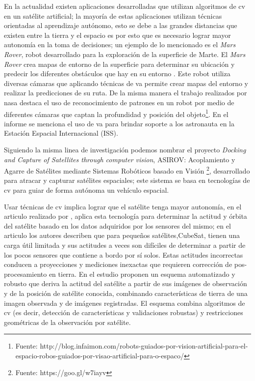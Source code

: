 En la actualidad existen aplicaciones desarrolladas que utilizan algoritmos de \ac{cv} en un satélite artificial; la mayoría de estas aplicaciones utilizan técnicas orientadas al aprendizaje autónomo, esto se debe a las grandes distancias que existen entre la tierra y el espacio es por esto que es necesario lograr mayor autonomía en la toma de decisiones; un ejemplo de lo mencionado es el \textit{Mars Rover}, robot desarrollado para la exploración de la superficie de Marte. El \textit{Mars Rover} crea mapas de entorno de la superficie para determinar su ubicación y predecir los diferentes obstáculos que hay en su entorno \citep{RoverMars}. Este robot utiliza  diversas cámaras que aplicando técnicas de \ac{va}  permite crear mapas del entorno y realizar la predicciones de su ruta. De la misma manera el trabajo realizados  por \ac{nasa}  destaca el uso de reconocimiento de patrones en un robot por medio de diferentes cámaras que captan la profundidad y posición del objeto\footnote{Fuente: 
http://blog.infaimon.com/robots-guiados-por-vision-artificial-para-el-espacio-robos-guiados-por-visao-artificial-para-o-espaco/}. En el informe se menciona el uso de \ac{va} para brindar soporte a los astronauta en la Estación Espacial Internacional (ISS). 

Siguiendo la misma linea de investigación podemos nombrar el proyecto \textit{Docking and Capture of Satellites through computer vision}, ASIROV: Acoplamiento y Agarre de Satélites mediante Sistemas Robóticos basado en Visión \footnote{Fuente: https://goo.gl/w7iayv}, desarrollado para atracar y capturar satélites espaciales; este sistema se basa  en tecnologías de \ac{cv} para guiar de forma autónoma un vehículo espacial.


Usar técnicas de \ac{cv} implica lograr que el satélite tenga mayor autonomía, en el articulo realizado por \cite{Kouyama}, aplica esta tecnología para determinar la actitud y órbita del satélite basado en los datos adquiridos por los sensores del mismo; en el articulo los autores describen que para pequeños satélites,CubeSat, tienen una carga útil limitada y sus actitudes a veces son difíciles de determinar a partir de los pocos sensores que contiene a bordo por sí solos. Estas actitudes incorrectas conducen a proyecciones y mediciones inexactas que requieren corrección de pos-procesamiento en tierra. En el estudio proponen un esquema automatizado y robusto que deriva la actitud del satélite a partir de sus imágenes de observación y de la posición de satélite conocida, combinando características de tierra de una imagen observada y de imágenes registradas. El esquema combina algoritmos de \ac{cv} (es decir, detección de características y validaciones robustas) y restricciones geométricas de la observación por satélite.


